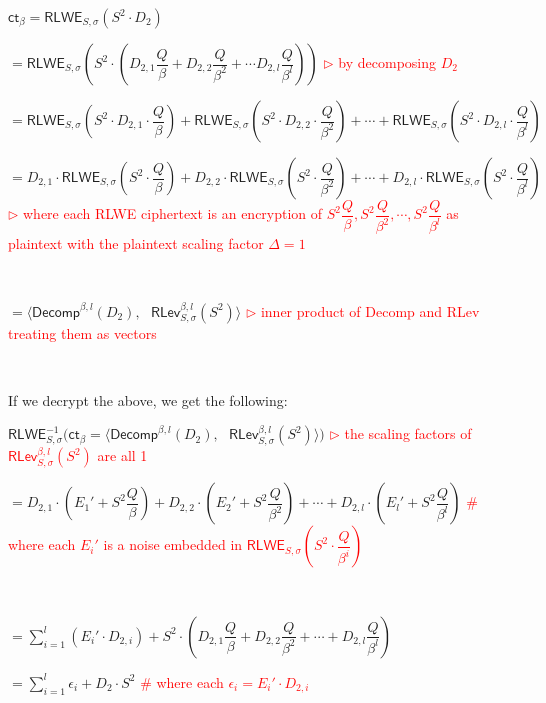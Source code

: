 $\textsf{ct}_\beta = \textsf{RLWE}_{S, \sigma}(S^2 \cdot D_2)$

$= \textsf{RLWE}_{S, \sigma}\left( S^2 \cdot \left(D_{2,1}\dfrac{Q}{\beta} + D_{2,2}\dfrac{Q}{\beta^2} + \cdots D_{2,l}\dfrac{Q}{\beta^l}\right)\right)$ \textcolor{red}{  $\rhd$ by decomposing $D_2$}

$= \textsf{RLWE}_{S, \sigma}\left( S^2 \cdot D_{2,1} \cdot \dfrac{Q}{\beta}\right) + \textsf{RLWE}_{S, \sigma}\left( S^2 \cdot D_{2,2} \cdot \dfrac{Q}{\beta^2}\right) + \cdots + \textsf{RLWE}_{S, \sigma}\left( S^2 \cdot D_{2,l} \cdot \dfrac{Q}{\beta^l}\right)$ 

$= D_{2,1}\cdot\textsf{RLWE}_{S, \sigma}\left( S^2 \cdot \dfrac{Q}{\beta}\right) + D_{2,2}\cdot\textsf{RLWE}_{S, \sigma}\left( S^2 \cdot \dfrac{Q}{\beta^2}\right) + \cdots + D_{2,l}\cdot\textsf{RLWE}_{S, \sigma}\left( S^2 \cdot \dfrac{Q}{\beta^l}\right)$ 
\textcolor{red}{ $\rhd$ where each \textsf{RLWE} ciphertext is an encryption of $S^2\dfrac{Q}{\beta}, S^2\dfrac{Q}{\beta^2}, \cdots, S^2\dfrac{Q}{\beta^l}$ as plaintext with the plaintext scaling factor $\Delta = 1$}

$ $

$= \bm{\langle} \textsf{Decomp}^{\beta, l}(D_2), \text{ } \textsf{RLev}_{S, \sigma}^{\beta, l}( S^2) \bm{\rangle}$ \textcolor{red}{  $\rhd$ inner product of \textsf{Decomp} and \textsf{RLev} treating them as vectors}

$ $

If we decrypt the above, we get the following:

$\textsf{RLWE}_{S, \sigma}^{-1}(\textsf{ct}_\beta = \bm{\langle} \textsf{Decomp}^{\beta, l}(D_2), \text{ } \textsf{RLev}_{S, \sigma}^{\beta, l}( S^2) \bm{\rangle} \bm{)}$ \textcolor{red}{ $\rhd$ the scaling factors of $\textsf{RLev}_{S, \sigma}^{\beta, l}( S^2)$ are all 1}

$= D_{2,1}\cdot\left(E_1' +  S^2\dfrac{Q}{\beta}\right) + D_{2,2}\cdot\left(E_2' +  S^2\dfrac{Q}{\beta^2}\right) + \cdots + D_{2,l}\cdot\left(E_l' +  S^2\dfrac{Q}{\beta^l}\right)$ \textcolor{red}{ \text{ } \# where each $E_i'$ is a noise embedded in $\textsf{RLWE}_{S, \sigma}\left(S^2\cdot\dfrac{Q}{\beta^i}\right)$}

$ $

$= \sum\limits_{i=1}^{l} (E_i'\cdot D_{2,i}) +  S^2\cdot\left(D_{2,1}\dfrac{Q}{\beta} + D_{2,2}\dfrac{Q}{\beta^2} + \cdots + D_{2, l}\dfrac{Q}{\beta^l}\right)$

$= \sum\limits_{i=1}^{l} \epsilon_{i} + D_2\cdot S^2$ \textcolor{red}{ \text{ } \# where each $\epsilon_i = E_i'\cdot D_{2,i}$}

